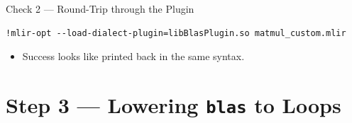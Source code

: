 \documentclass[aspectratio=169,10pt]{beamer}
\begin{document}
\begin{frame}[fragile]{Check 2 --- Round-Trip through the Plugin}
\begin{lstlisting}[style=plain,basicstyle=\ttfamily\small]
!mlir-opt --load-dialect-plugin=libBlasPlugin.so matmul_custom.mlir
\end{lstlisting}
  \vspace{0.5em}
  \begin{itemize}
    \item<2-> Success looks like \alert{ printed back in the same syntax}.
  \end{itemize}
  \vspace{0.5em}
\end{frame}

\section{Step 3 --- Lowering \texttt{blas} to Loops}
\begin{frame}[plain]\sectionpage\end{frame}
\end{document}
